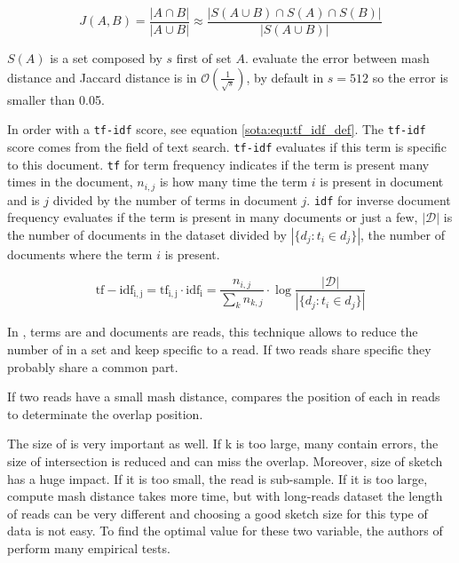 \documentclass[main]{subfiles}
\begin{document}
\begin{equation}
J(A,B) = \frac{|A \cap B|}{|A \cup B|} \approx \frac{|S(A \cup B) \cap S(A) \cap S(B)|}{|S(A \cup B)|}
\label{sota:equ:mash_dist_def}
\end{equation}

$S(A)$ is a \kmers set composed by $s$ first \kmers of set $A$. \citeauthor{mash_distance} evaluate the error between mash distance and Jaccard distance is in $\mathcal{O}(\frac{1}{\sqrt{s}})$, by default in \mhap $s=512$ so the error is smaller than 0.05.

In \mhap order \kmer with a \texttt{tf-idf} score, see equation \ref{sota:equ:tf_idf_def}. The \texttt{tf-idf} score comes from the field of text search. \texttt{tf-idf} evaluates if this term is specific to this document. \texttt{tf} for term frequency indicates if the term is present many times in the document, $n_{i,j}$ is how many time the term $i$ is present in document and is $j$ divided by the number of terms in document $j$. \texttt{idf} for inverse document frequency evaluates if the term is present in many documents or just a few, $|\mathcal{D}|$ is the number of documents in the dataset divided by $|\{d_{j}:t_{i}\in d_{j}\}|$, the number of documents where the term $i$ is present.

\begin{equation}
\mathrm{tf-idf_{i,j}} = \mathrm{tf_{i,j}} \cdot \mathrm{idf_{i}} = \frac{n_{i,j}}{\sum_{k}n_{k,j}} \cdot \log{\frac  {|\mathcal{D}|}{|\{d_{j}:t_{i}\in d_{j}\}|}}
\label{sota:equ:tf_idf_def}
\end{equation}

In \mhap, terms are \kmer and documents are reads, this technique allows to reduce the number of \kmer in a set and keep \kmer specific to a read. If two reads share specific \kmer they probably share a common part.

If two reads have a small mash distance, \mhap compares the position of each \kmer in reads to determinate the overlap position.

The size of \kmer is very important as well. If k is too large, many \kmer contain errors, the size of intersection is reduced and \mhap can miss the overlap. Moreover, size of sketch has a huge impact. If it is too small, the read is sub-sample. If it is too large, compute mash distance takes more time, but with long-reads dataset the length of reads can be very different and choosing a good sketch size for this type of data is not easy. To find the optimal value for these two variable, the authors of \mhap perform many empirical tests.
\end{document}
